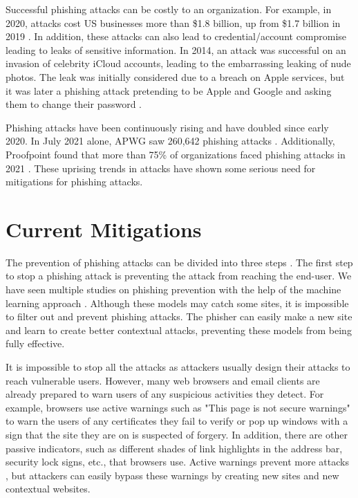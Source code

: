 Successful phishing attacks can be costly to an organization. For example, in 2020, attacks cost US businesses more than \$1.8 billion, up from \$1.7 billion in 2019 \cite{vade}. In addition, these attacks can also lead to credential/account compromise leading to leaks of sensitive information. In 2014, an attack was successful on an invasion of celebrity iCloud accounts, leading to the embarrassing leaking of nude photos. The leak was initially considered due to a breach on Apple services, but it was later a phishing attack pretending to be Apple and Google and asking them to change their password \cite{duke_2014, guardian_2014}.

Phishing attacks have been continuously rising and have doubled since early 2020. In July 2021 alone, APWG saw 260,642 phishing attacks \cite{apwg}. Additionally, Proofpoint found that more than 75\% of organizations faced phishing attacks in 2021 \cite{proofpoint}. These uprising trends in attacks have shown some serious need for mitigations for phishing attacks.

\section{Current Mitigations}
The prevention of phishing attacks can be divided into three steps \cite{vayansky}. The first step to stop a phishing attack is preventing the attack from reaching the end-user. We have seen multiple studies on phishing prevention with the help of the machine learning approach \cite{yang_zheng_wu_wu_wang_2021, sahingoz_buber_demir_diri_2019}. Although these models may catch some sites, it is impossible to filter out and prevent phishing attacks. The phisher can easily make a new site and learn to create better contextual attacks, preventing these models from being fully effective.

It is impossible to stop all the attacks as attackers usually design their attacks to reach vulnerable users. However, many web browsers and email clients are already prepared to warn users of any suspicious activities they detect. For example, browsers use active warnings such as "This page is not secure warnings" to warn the users of any certificates they fail to verify or pop up windows with a sign that the site they are on is suspected of forgery. In addition, there are other passive indicators, such as different shades of link highlights in the address bar, security lock signs, etc., that browsers use. Active warnings prevent more attacks \cite{vayansky}, but attackers can easily bypass these warnings by creating new sites and new contextual websites.

